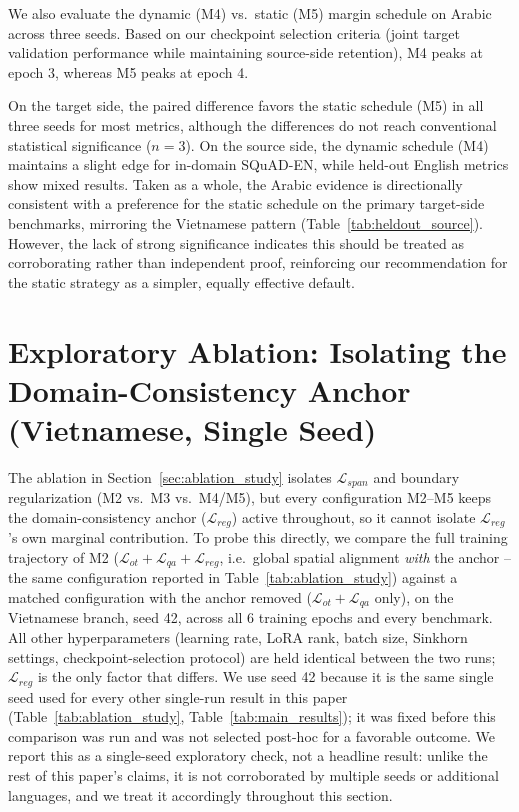 \documentclass[11pt]{article}
\begin{document}
We also evaluate the dynamic (M4) vs.\ static (M5) margin schedule on Arabic across three seeds. Based on our checkpoint selection criteria (joint target validation performance while maintaining source-side retention), M4 peaks at epoch 3, whereas M5 peaks at epoch 4.

On the target side, the paired difference favors the static schedule (M5) in all three seeds for most metrics, although the differences do not reach conventional statistical significance ($n=3$). On the source side, the dynamic schedule (M4) maintains a slight edge for in-domain SQuAD-EN, while held-out English metrics show mixed results. Taken as a whole, the Arabic evidence is directionally consistent with a preference for the static schedule on the primary target-side benchmarks, mirroring the Vietnamese pattern (Table~\ref{tab:heldout_source}). However, the lack of strong significance indicates this should be treated as corroborating rather than independent proof, reinforcing our recommendation for the static strategy as a simpler, equally effective default.

\section{Exploratory Ablation: Isolating the Domain-Consistency Anchor (Vietnamese, Single Seed)}
\label{sec:appendix_reg_ablation}
The ablation in Section~\ref{sec:ablation_study} isolates $\mathcal{L}_{span}$ and boundary regularization (M2 vs.\ M3 vs.\ M4/M5), but every configuration M2--M5 keeps the domain-consistency anchor ($\mathcal{L}_{reg}$) active throughout, so it cannot isolate $\mathcal{L}_{reg}$'s own marginal contribution. To probe this directly, we compare the full training trajectory of M2 ($\mathcal{L}_{ot}+\mathcal{L}_{qa}+\mathcal{L}_{reg}$, i.e.\ global spatial alignment \emph{with} the anchor -- the same configuration reported in Table~\ref{tab:ablation_study}) against a matched configuration with the anchor removed ($\mathcal{L}_{ot}+\mathcal{L}_{qa}$ only), on the Vietnamese branch, seed 42, across all 6 training epochs and every benchmark. All other hyperparameters (learning rate, LoRA rank, batch size, Sinkhorn settings, checkpoint-selection protocol) are held identical between the two runs; $\mathcal{L}_{reg}$ is the only factor that differs. We use seed 42 because it is the same single seed used for every other single-run result in this paper (Table~\ref{tab:ablation_study}, Table~\ref{tab:main_results}); it was fixed before this comparison was run and was not selected post-hoc for a favorable outcome. We report this as a single-seed exploratory check, not a headline result: unlike the rest of this paper's claims, it is not corroborated by multiple seeds or additional languages, and we treat it accordingly throughout this section.
\end{document}
